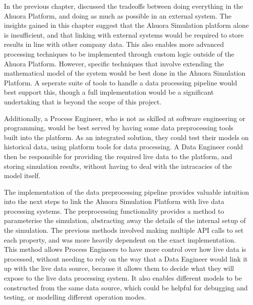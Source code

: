 In the previous chapter,  discussed the tradeoffs between doing everything in the Ahuora Platform, and doing as much as possible in an external system. The insights gained in this chapter suggest that the Ahuora Simulation platform alone is insufficient, and that linking with external systems would be required to store results in line with other company data. This also enables more advanced processing techniques to be implemented through custom logic outside of the Ahuora Platform. However, specific techniques that involve extending the mathematical model of the system would be best done in the Ahuora Simulation Platform. A seperate suite of tools to handle a data processing pipeline would best support this, though a full implementation would be a significant undertaking that is beyond the scope of this project. 

Additionally, a Process Engineer, who is not as skilled at software engineering or programming, would be best served by having some data preprocessing tools built into the platform. As an integrated solution, they could test their models on historical data, using platform tools for data processing. A Data Engineer could then be responsible for providing the required live data to the platform, and storing simulation results, without having to deal with the intracacies of the model itself.


The implementation of the data preprocessing pipeline provides valuable intuition into the next steps to link the Ahuora Simulation Platform with live data processing systems. The preprocessing functionality provides a method to parameterise the simulation, abstracting away the details of the internal setup of the simulation. The previous methods involved making multiple API calls to set each property, and was more heavily dependent on the exact implementation. This method allows Process Engineers to have more control over how live data is processed, without needing to rely on the way that a Data Engineer would link it up with the live data source, because it allows them to decide what they will expose to the live data processing system. It also enables different models to be constructed from the same data source, which could be helpful for debugging and testing, or modelling different operation modes.





